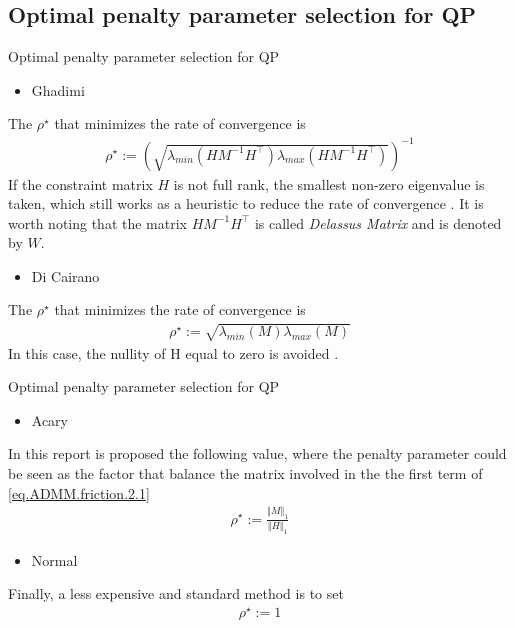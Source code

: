 \documentclass[8pt,red]{beamer}
\theoremstyle{plain}
\theoremstyle{definition}
\theoremstyle{remark}
\begin{document}
\subsection{Optimal penalty parameter selection for QP}

\begin{frame}{Optimal penalty parameter selection for QP}

\begin{itemize}
\item Ghadimi
\end{itemize}
The $\rho^{\star}$ that minimizes the rate of convergence is
\begin{align}
  \rho^{\star} := \left(\sqrt{\lambda_{min}(H M^{-1} H^{\top}) \lambda_{max}(H M^{-1} H^{\top})}\right) ^{-1} 
\end{align}
If the constraint matrix $H$ is not full rank, the smallest non-zero eigenvalue is taken, which still works as a heuristic to reduce the rate of convergence \citep{ghadimi2015optimal}. It is worth noting that the matrix $H M^{-1} H^{\top}$ is called \textit{Delassus Matrix} and is denoted by $W$.

\begin{itemize}
\item Di Cairano
\end{itemize}
The $\rho^{\star}$ that minimizes the rate of convergence is
\begin{align}
  \rho^{\star} := \sqrt{\lambda_{min}(M) \lambda_{max}(M)}
\end{align}
In this case, the nullity of H equal to zero is avoided \citep{raghunathan2014alternating}.
\end{frame}

\begin{frame}{Optimal penalty parameter selection for QP}

\begin{itemize}
\item Acary
\end{itemize}
In this report is proposed the following value, where the penalty parameter could be seen as the factor that balance the matrix involved in the the first term of \eqref{eq.ADMM.friction.2.1}
\begin{align}
  \rho^{\star} := \frac{\Vert M \Vert_{1}}{\Vert H \Vert_{1}}
\end{align}

\begin{itemize}
\item Normal
\end{itemize}
Finally, a less expensive and standard method is to set
\begin{align}
  \rho^{\star} := 1
\end{align}
\end{frame}
\end{document}

